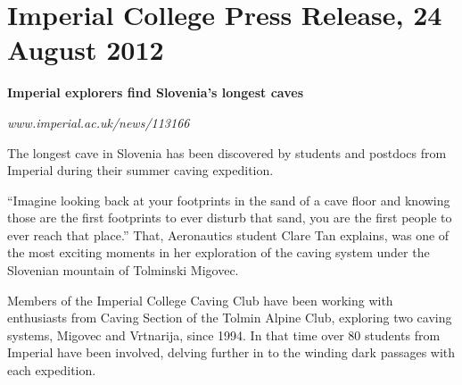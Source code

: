\section{Imperial College Press Release, 24 August 2012}


\textbf{Imperial explorers find Slovenia’s longest caves}


\textit{www.imperial.ac.uk/news/113166}


The longest cave in Slovenia has been discovered by students and postdocs from Imperial during their summer caving expedition.

“Imagine looking back at your footprints in the sand of a cave floor and knowing those are the first footprints to ever disturb that sand, you are the first people to ever reach that place.” That, Aeronautics student Clare Tan explains, was one of the most exciting moments in her exploration of the caving system under the Slovenian mountain of Tolminski Migovec.

Members of the Imperial College Caving Club have been working with enthusiasts from Caving Section of the Tolmin Alpine Club, exploring two caving systems, Migovec and Vrtnarija, since 1994. In that time over 80 students from Imperial have been involved, delving further in to the winding dark passages with each expedition.

